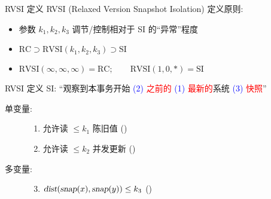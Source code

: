 \begin{frame}{RVSI 定义}
  RVSI {\small (Relaxed Version Snapshot Isolation)} 定义原则:
  \begin{itemize}
    \item<1-> 参数 $k_1, k_2, k_3$ 调节/控制相对于 SI 的``异常''程度
    \item<2-> $\text{RC} \supset \text{RVSI}(k_1, k_2, k_3) \supset \text{SI}$
    \item<2-> $\text{RVSI}(\infty,\infty,\infty) = \text{RC}; \qquad \text{RVSI}(1,0,\ast) = \text{SI}$
  \end{itemize}

  \vspace{0.60cm}

\end{frame}
\begin{frame}{RVSI 定义}
  SI: ``观察到本事务开始 \textcolor{blue}{\scriptsize (2) }\textcolor{red}{之前的} 
	\textcolor{blue}{\scriptsize (1) }\textcolor{red}{最新的}系统 \textcolor{blue}{\scriptsize (3) }\textcolor{red}{快照}''

  \begin{cdef}
	\vspace{5pt}

    \begin{description}
      \item[单变量:] \hfill 
        \begin{enumerate}
		  \item 允许读 $\le k_1$ 陈旧值 (\konebv{})
		  \item 允许读 $\le k_2$ 并发更新 (\ktwofv{})
        \end{enumerate}
      \item[多变量:] \hfill
        \begin{enumerate}
          \setcounter{enumi}{2}
		\item $\textsl{dist}(\textsl{snap}{(x)},\textsl{snap}{(y)}) \le k_3$ (\kthreesv{})
        \end{enumerate}
    \end{description}
  \end{cdef}
\end{frame}
